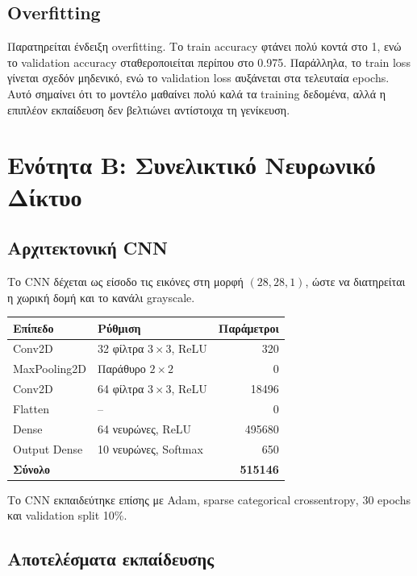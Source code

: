 \documentclass[12pt,a4paper]{article}
\begin{document}
\subsection{Overfitting}

Παρατηρείται ένδειξη overfitting. Το train accuracy φτάνει πολύ κοντά στο 1,
ενώ το validation accuracy σταθεροποιείται περίπου στο 0.975. Παράλληλα, το
train loss γίνεται σχεδόν μηδενικό, ενώ το validation loss αυξάνεται στα
τελευταία epochs. Αυτό σημαίνει ότι το μοντέλο μαθαίνει πολύ καλά τα training
δεδομένα, αλλά η επιπλέον εκπαίδευση δεν βελτιώνει αντίστοιχα τη γενίκευση.

\section{Ενότητα Β: Συνελικτικό Νευρωνικό Δίκτυο}

\subsection{Αρχιτεκτονική CNN}

Το CNN δέχεται ως είσοδο τις εικόνες στη μορφή \((28,28,1)\), ώστε να
διατηρείται η χωρική δομή και το κανάλι grayscale.

\begin{center}
\begin{tabular}{llr}
\toprule
\textbf{Επίπεδο} & \textbf{Ρύθμιση} & \textbf{Παράμετροι} \\
\midrule
Conv2D & 32 φίλτρα \(3 \times 3\), ReLU & 320 \\
MaxPooling2D & Παράθυρο \(2 \times 2\) & 0 \\
Conv2D & 64 φίλτρα \(3 \times 3\), ReLU & 18496 \\
Flatten & -- & 0 \\
Dense & 64 νευρώνες, ReLU & 495680 \\
Output Dense & 10 νευρώνες, Softmax & 650 \\
\midrule
\textbf{Σύνολο} & & \textbf{515146} \\
\bottomrule
\end{tabular}
\end{center}

Το CNN εκπαιδεύτηκε επίσης με Adam, \textenglish{sparse categorical crossentropy},
30 epochs και validation split 10\%.

\subsection{Αποτελέσματα εκπαίδευσης}
\end{document}

